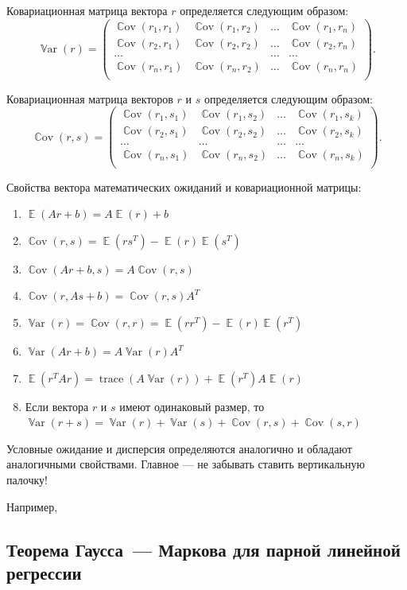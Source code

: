 \documentclass[12pt]{article}
\DeclareMathOperator{\Cov}{\mathbb{C}ov}
\DeclareMathOperator{\Var}{\mathbb{V}ar}
\DeclareMathOperator{\E}{\mathbb{E}}
\DeclareMathOperator{\trace}{trace}
\begin{document}
Ковариационная матрица вектора $r$ определяется следующим образом:
\[
\Var(r) = \begin{pmatrix}
	\Cov(r_1,r_1) & \Cov(r_1,r_2) & \dots & \Cov(r_1,r_n) \\
	\Cov(r_2,r_1) & \Cov(r_2,r_2) & \dots & \Cov(r_2,r_n) \\
        \dots & & \dots & \dots\\
        \Cov(r_n,r_1) & \Cov(r_n,r_2) & \dots & \Cov(r_n,r_n) \\
      \end{pmatrix}.
\]

Ковариационная матрица векторов $r$ и $s$ определяется следующим образом:
\[
\Cov(r,s) = \begin{pmatrix}
	\Cov(r_1,s_1) & \Cov(r_1,s_2) & \dots & \Cov(r_1,s_k) \\
	\Cov(r_2,s_1) & \Cov(r_2,s_2) & \dots & \Cov(r_2,s_k) \\
        \dots & \dots & \dots & \dots\\
        \Cov(r_n,s_1) & \Cov(r_n,s_2) & \dots & \Cov(r_n,s_k) \\
      \end{pmatrix}.
\]

Свойства вектора математических ожиданий и ковариационной матрицы:
\begin{enumerate}
    \item $\E(Ar+b) = A\E(r)+b$
    \item $\Cov(r,s) = \E(rs^T)-\E(r)\E(s^T)$
    \item $\Cov(Ar+b,s) = A\Cov(r,s)$
    \item $\Cov(r,As+b) = \Cov(r,s)A^T$
    \item $\Var(r)=\Cov(r,r) = \E(rr^T)-\E(r)\E(r^T)$
    \item $\Var(Ar+b) = A\Var(r)A^T$
    \item $\E(r^T Ar) = \trace(A\Var(r))+\E(r^T) A\E(r)$  
    \item Если вектора $r$ и $s$ имеют одинаковый размер, то
    $\Var(r + s) = \Var(r) + \Var(s) + \Cov(r, s) + \Cov(s, r)$
\end{enumerate}

Условные ожидание и дисперсия определяются аналогично и обладают аналогичными свойствами.
Главное — не забывать ставить вертикальную палочку!

Например, 

\subsection{Теорема Гаусса~— Маркова для парной линейной регрессии}
\end{document}
